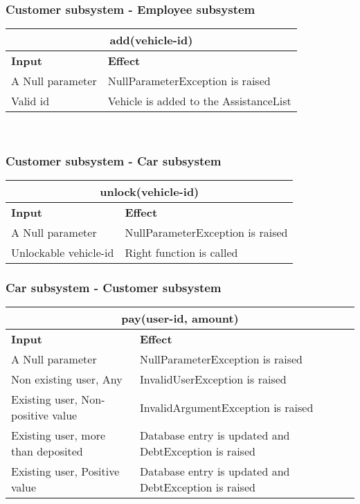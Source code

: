 \subsubsection{Customer subsystem - Employee subsystem}
\begin{tabular}{|p{5cm}|p{7cm}|}
\hline
\multicolumn{2}{|c|}{add(vehicle-id)} \\
\hline
\textbf{Input} & \textbf{Effect} \\

\hline
A Null parameter & NullParameterException is raised \\

\hline
Valid id & Vehicle is added to the AssistanceList \\
\hline
\end{tabular}
\\

\subsubsection{Customer subsystem - Car subsystem}
\begin{tabular}{|p{5cm}|p{7cm}|}
\hline
\multicolumn{2}{|c|}{unlock(vehicle-id)}\\
\hline
\textbf{Input} & \textbf{Effect}\\

\hline
A Null parameter & NullParameterException is raised \\

\hline
Unlockable vehicle-id & Right function is called\\
\hline
\end{tabular}

\subsubsection{Car subsystem - Customer subsystem}
\begin{tabular}{|p{5cm}|p{7cm}|}
\hline
\multicolumn{2}{|c|}{pay(user-id, amount)} \\
\hline
\textbf{Input} & \textbf{Effect} \\

\hline
A Null parameter & NullParameterException is raised \\

\hline
Non existing user, Any & InvalidUserException is raised \\

\hline
Existing user, Non-positive value & InvalidArgumentException is raised \\

\hline
Existing user, more than deposited & Database entry is updated and DebtException is raised \\

\hline
Existing user, Positive value & Database entry is updated and DebtException is raised \\
\hline
\end{tabular}

